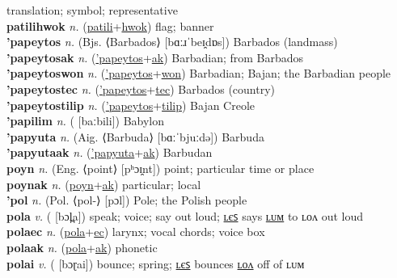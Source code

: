 translation; symbol; representative \label{patililum} \\
\textbf{patilihwok} \textit{n.} (\hyperref[patili]{patili}+\hyperref[hwok]{hwok})
flag; banner \label{patilihwok} \\
\textbf{'papeytos} \textit{n.} (Bjs. ⟨Barbados⟩ [bɑːɹˈbeɪ̯dɒs])
Barbados (landmass) \label{'papeytos} \\
\textbf{'papeytosak} \textit{n.} (\hyperref['papeytos]{'papeytos}+\hyperref[ak]{ak})
Barbadian; from Barbados \label{'papeytosak} \\
\textbf{'papeytoswon} \textit{n.} (\hyperref['papeytos]{'papeytos}+\hyperref[won]{won})
Barbadian; Bajan; the Barbadian people \label{'papeytoswon} \\
\textbf{'papeytostec} \textit{n.} (\hyperref['papeytos]{'papeytos}+\hyperref[tec]{tec})
Barbados (country) \label{'papeytostec} \\
\textbf{'papeytostilip} \textit{n.} (\hyperref['papeytos]{'papeytos}+\hyperref[tilip]{tilip})
Bajan Creole \label{'papeytostilip} \\
\textbf{'papilim} \textit{n.} ( [baːbili])
Babylon \label{'papilim} \\
\textbf{'papyuta} \textit{n.} (Aig. ⟨Barbuda⟩ [bɑːˈbjuːdə])
Barbuda \label{'papyuta} \\
\textbf{'papyutaak} \textit{n.} (\hyperref['papyuta]{'papyuta}+\hyperref[ak]{ak})
Barbudan \label{'papyutaak} \\
\textbf{poyn} \textit{n.} (Eng. ⟨point⟩ [pʰɔɪ̯nt])
point; particular time or place \label{poyn} \\
\textbf{poynak} \textit{n.} (\hyperref[poyn]{poyn}+\hyperref[ak]{ak})
particular; local \label{poynak} \\
\textbf{'pol} \textit{n.} (Pol. ⟨pol-⟩ [pɔl])
Pole; the Polish people \label{'pol} \\
\textbf{pola} \textit{v.} ( [bɔl̪a])
speak; voice; say out loud; \hyperref[polales]{ʟєꜱ} says \hyperref[polalum]{ʟᴜᴍ} to ʟᴏᴧ out loud \label{pola} \\
\textbf{polaec} \textit{n.} (\hyperref[pola]{pola}+\hyperref[ec]{ec})
larynx; vocal chords; voice box \label{polaec} \\
\textbf{polaak} \textit{n.} (\hyperref[pola]{pola}+\hyperref[ak]{ak})
phonetic \label{polaak} \\
\textbf{polai} \textit{v.} ( [bɔɽai])
bounce; spring; \hyperref[polailes]{ʟєꜱ} bounces \hyperref[polailon]{ʟᴏᴧ} off of ʟᴜᴍ \label{polai} \\
